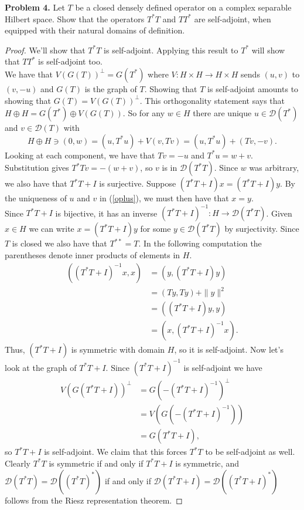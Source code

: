\documentclass[11pt,letterpaper]{report}
\newcommand{\mcal}[1]{\mathcal{#1}}
\begin{document}
\noindent\textbf{Problem 4. }Let $T$ be a closed densely defined operator on a complex separable Hilbert space. Show that the operators $T^*T$ and $TT^*$ are self-adjoint, when equipped with their natural domains of definition.
\begin{proof}
	We'll show that $T^*T$ is self-adjoint. Applying this result to $T^*$ will show that $TT^*$ is self-adjoint too.\\

	\noindent We have that $V(G(T))^\perp = G(T^*)$ where $V:H\times H\to H\times H$ sends $(u, v)$ to $(v, -u)$ and $G(T)$ is the graph of $T$. Showing that $T$ is self-adjoint amounts to showing that $G(T) = V(G(T))^\perp$. This orthogonality statement says that $H\oplus H = G(T^*)\oplus V(G(T))$. So for any $w\in H$ there are unique $u\in \mcal{D}(T^*)$ and $v\in \mcal{D}(T)$ with
	\begin{equation}\label{oplus}
	H\oplus H\ni (0, w)= (u, T^*u) + V(v, Tv) = (u, T^*u) + (Tv, -v).
	\end{equation}
	Looking at each component, we have that $Tv = -u$ and $T^*u = w+v$. Substitution gives $T^*Tv = -(w+v)$, so $v$ is in $\mcal{D}(T^*T)$. Since $w$ was arbitrary, we also have that $T^*T+I$ is surjective. Suppose $(T^*T+I)x = (T^*T+I)y$. By the uniqueness of $u$ and $v$ in (\ref{oplus}), we must then have that $x = y$.\\

	\noindent Since $T^*T+I$ is bijective, it has an inverse $(T^*T+I)^{-1}: H\to \mcal{D}(T^*T)$. Given $x\in H$ we can write $x = (T^*T+I)y$ for some $y\in \mcal{D}(T^*T)$ by surjectivity. Since $T$ is closed we also have that $T^{**} = T$. In the following computation the parentheses denote inner products of elements in $H$.
	\begin{align*}
		((T^*T+I)^{-1}x, x) &= (y, (T^*T+I)y)\\
		&= (Ty, Ty) + \|y\|^2\\
		&= ((T^*T+I)y, y)\\
		&= (x, (T^*T+I)^{-1}x).
	\end{align*}
	Thus, $(T^*T+I)$ is symmetric with domain $H$, so it is self-adjoint. Now let's look at the graph of $T^*T+I$. Since $(T^*T+I)^{-1}$ is self-adjoint we have
	\begin{align*}
		V(G(T^*T+I))^\perp &= G(-(T^*T+I)^{-1})^\perp\\
		&= V(G(-(T^*T+I)^{-1}))\\
		&= G(T^*T+I),
	\end{align*}
	so $T^*T+I$ is self-adjoint. We claim that this forces $T^*T$ to be self-adjoint as well. Clearly $T^*T$ is symmetric if and only if $T^*T+I$ is symmetric, and $\mcal{D}(T^*T)= \mcal{D}((T^*T)^*)$ if and only if $\mcal{D}(T^*T+I) = \mcal{D}((T^*T+I)^*)$ follows from the Riesz representation theorem.
\end{proof}
	
\end{document}
